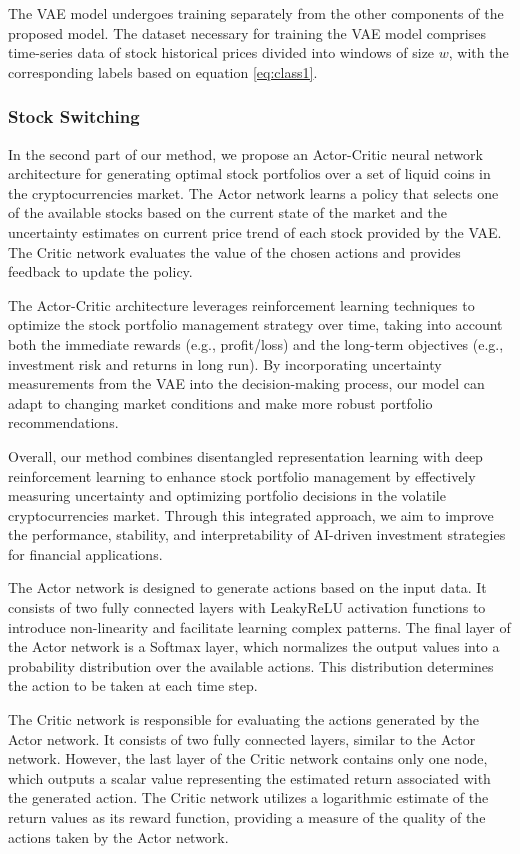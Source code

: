 The VAE model undergoes training separately from the other components of the proposed model. The dataset necessary for training the VAE model comprises time-series data of stock historical prices divided into windows of size $w$, with the corresponding labels based on equation \eqref{eq:class1}.

\subsubsection{Stock Switching}

In the second part of our method, we propose an Actor-Critic neural network architecture for generating optimal stock portfolios over a set of liquid coins in the cryptocurrencies market. The Actor network learns a policy that selects one of the available stocks based on the current state of the market and the uncertainty estimates on current price trend of each stock provided by the VAE. The Critic network evaluates the value of the chosen actions and provides feedback to update the policy.

The Actor-Critic architecture leverages reinforcement learning techniques to optimize the stock portfolio management strategy over time, taking into account both the immediate rewards (e.g., profit/loss) and the long-term objectives (e.g., investment risk and returns in long run). By incorporating uncertainty measurements from the VAE into the decision-making process, our model can adapt to changing market conditions and make more robust portfolio recommendations.

Overall, our method combines disentangled representation learning with deep reinforcement learning to enhance stock portfolio management by effectively measuring uncertainty and optimizing portfolio decisions in the volatile cryptocurrencies market. Through this integrated approach, we aim to improve the performance, stability, and interpretability of AI-driven investment strategies for financial applications.

The Actor network is designed to generate actions based on the input data. It consists of two fully connected layers with LeakyReLU activation functions to introduce non-linearity and facilitate learning complex patterns. The final layer of the Actor network is a Softmax layer, which normalizes the output values into a probability distribution over the available actions. This distribution determines the action to be taken at each time step.

The Critic network is responsible for evaluating the actions generated by the Actor network. It consists of two fully connected layers, similar to the Actor network. However, the last layer of the Critic network contains only one node, which outputs a scalar value representing the estimated return associated with the generated action. The Critic network utilizes a logarithmic estimate of the return values as its reward function, providing a measure of the quality of the actions taken by the Actor network.

